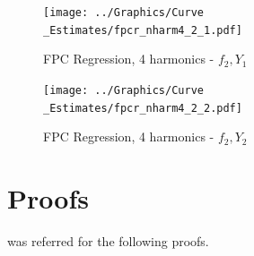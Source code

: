\documentclass[11pt,twoside,a4paper]{article}
\begin{document}
	\begin{figure}[H]
		\centering
		\begin{minipage}{.5\textwidth}
			\centering
			\texttt{[image: ../Graphics/Curve\\\_Estimates/fpcr\_nharm4\_2\_1.pdf]}
			\caption{FPC Regression, 4 harmonics - $f_2, Y_1$}
		\end{minipage}%
		\begin{minipage}{.5\textwidth}
			\centering
			\texttt{[image: ../Graphics/Curve\\\_Estimates/fpcr\_nharm4\_2\_2.pdf]}
			\caption{FPC Regression, 4 harmonics - $f_2, Y_2$}
		\end{minipage}
	\end{figure}

	\section{Proofs}
	\cite{alexanderian_KLexpansion_2015} was referred for the following proofs.
\end{document}
